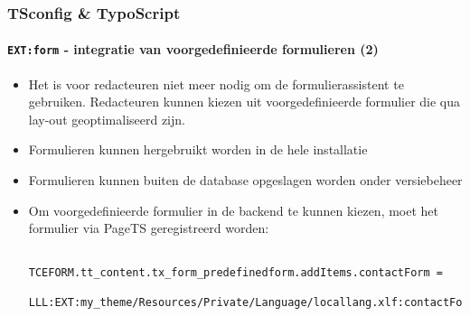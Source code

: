 \begin{frame}[fragile]
	\frametitle{TSconfig \& TypoScript}
	\framesubtitle{\texttt{EXT:form} - integratie van voorgedefinieerde formulieren (2)}

	\lstset{basicstyle=\tiny\ttfamily}

	\begin{itemize}

		\item Het is voor redacteuren niet meer nodig om de formulierassistent te gebruiken.
			Redacteuren kunnen kiezen uit voorgedefinieerde formulier die qua lay-out geoptimaliseerd zijn.

		\item Formulieren kunnen hergebruikt worden in de hele installatie

		\item Formulieren kunnen buiten de database opgeslagen worden onder versiebeheer

		\item Om voorgedefinieerde formulier in de backend te kunnen kiezen, moet het formulier via
			PageTS geregistreerd worden:

		\begin{lstlisting}
			TCEFORM.tt_content.tx_form_predefinedform.addItems.contactForm =
			  LLL:EXT:my_theme/Resources/Private/Language/locallang.xlf:contactForm
		\end{lstlisting}

	\end{itemize}

\end{frame}

